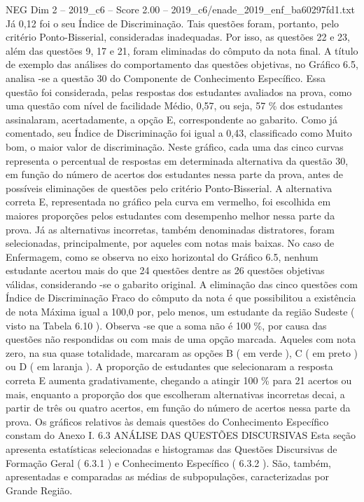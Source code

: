 \begin{textsample}{NEG Dim 2 – 2019\_c6 – Score 2.00 – 2019\_c6/enade\_2019\_enf\_ba60297fd1.txt}
Já 0,12 foi o seu Índice de Discriminação.
Tais questões foram, portanto, pelo critério Ponto-Bisserial, consideradas inadequadas.
Por isso, as questões 22 e 23, além das questões 9, 17 e 21, foram eliminadas do cômputo da nota final.
A título de exemplo das análises do comportamento das questões objetivas, no Gráfico 6.5, analisa -se a questão 30 do Componente de Conhecimento Específico.
Essa questão foi considerada, pelas respostas dos estudantes avaliados na prova, como uma questão com nível de facilidade Médio, 0,57, ou seja, 57 \% dos estudantes assinalaram, acertadamente, a opção E, correspondente ao gabarito.
Como já comentado, seu Índice de Discriminação foi igual a 0,43, classificado como Muito bom, o maior valor de discriminação.
Neste gráfico, cada uma das cinco curvas representa o percentual de respostas em determinada alternativa da questão 30, em função do número de acertos dos estudantes nessa parte da prova, antes de possíveis eliminações de questões pelo critério Ponto-Bisserial.
A alternativa correta E, representada no gráfico pela curva em vermelho, foi escolhida em maiores proporções pelos estudantes com desempenho melhor nessa parte da prova.
Já as alternativas incorretas, também denominadas distratores, foram selecionadas, principalmente, por aqueles com notas mais baixas.
No caso de Enfermagem, como se observa no eixo horizontal do Gráfico 6.5, nenhum estudante acertou mais do que 24 questões dentre as 26 questões objetivas válidas, considerando -se o gabarito original.
A eliminação das cinco questões com Índice de Discriminação Fraco do cômputo da nota é que possibilitou a existência de nota Máxima igual a 100,0 por, pelo menos, um estudante da região Sudeste ( visto na Tabela 6.10 ).
Observa -se que a soma não é 100 \%, por causa das questões não respondidas ou com mais de uma opção marcada.
Aqueles com nota zero, na sua quase totalidade, marcaram as opções B ( em verde ), C ( em preto ) ou D ( em laranja ).
A proporção de estudantes que selecionaram a resposta correta E aumenta gradativamente, chegando a atingir 100 \% para 21 acertos ou mais, enquanto a proporção dos que escolheram alternativas incorretas decai, a partir de três ou quatro acertos, em função do número de acertos nessa parte da prova.
Os gráficos relativos às demais questões do Conhecimento Específico constam do Anexo I. 6.3 ANÁLISE DAS QUESTÕES DISCURSIVAS Esta seção apresenta estatísticas selecionadas e histogramas das Questões Discursivas de Formação Geral ( 6.3.1 ) e Conhecimento Específico ( 6.3.2 ).
São, também, apresentadas e comparadas as médias de subpopulações, caracterizadas por Grande Região.

\end{textsample}
